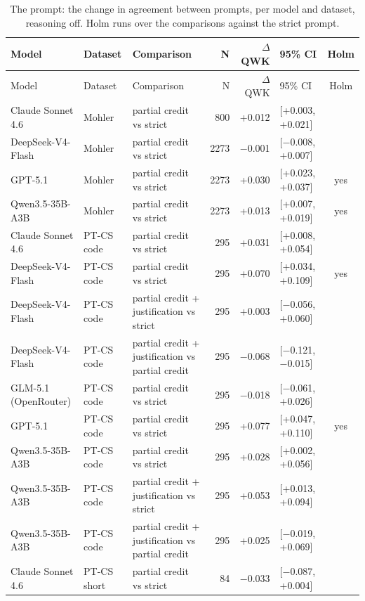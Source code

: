 \documentclass[10pt]{article}
\begin{document}
\begingroup\footnotesize
\begin{longtable}{ll>{\raggedright\arraybackslash}p{4.2cm}rrlc}
\caption{The prompt: the change in agreement between prompts, per model and dataset, reasoning off. Holm runs over the comparisons against the strict prompt.}\\
\hline
Model & Dataset & Comparison & N & $\Delta$QWK & 95\% CI & Holm \\ \hline
\endfirsthead
\hline
Model & Dataset & Comparison & N & $\Delta$QWK & 95\% CI & Holm \\ \hline
\endhead
Claude Sonnet 4.6 & Mohler & partial credit vs strict & 800 & +0.012 & [+0.003, +0.021] &  \\
DeepSeek-V4-Flash & Mohler & partial credit vs strict & 2273 & $-$0.001 & [$-$0.008, +0.007] &  \\
GPT-5.1 & Mohler & partial credit vs strict & 2273 & +0.030 & [+0.023, +0.037] & yes \\
Qwen3.5-35B-A3B & Mohler & partial credit vs strict & 2273 & +0.013 & [+0.007, +0.019] & yes \\
Claude Sonnet 4.6 & PT-CS code & partial credit vs strict & 295 & +0.031 & [+0.008, +0.054] &  \\
DeepSeek-V4-Flash & PT-CS code & partial credit vs strict & 295 & +0.070 & [+0.034, +0.109] & yes \\
DeepSeek-V4-Flash & PT-CS code & partial credit + justification vs strict & 295 & +0.003 & [$-$0.056, +0.060] &  \\
DeepSeek-V4-Flash & PT-CS code & partial credit + justification vs partial credit & 295 & $-$0.068 & [$-$0.121, $-$0.015] &  \\
GLM-5.1 (OpenRouter) & PT-CS code & partial credit vs strict & 295 & $-$0.018 & [$-$0.061, +0.026] &  \\
GPT-5.1 & PT-CS code & partial credit vs strict & 295 & +0.077 & [+0.047, +0.110] & yes \\
Qwen3.5-35B-A3B & PT-CS code & partial credit vs strict & 295 & +0.028 & [+0.002, +0.056] &  \\
Qwen3.5-35B-A3B & PT-CS code & partial credit + justification vs strict & 295 & +0.053 & [+0.013, +0.094] &  \\
Qwen3.5-35B-A3B & PT-CS code & partial credit + justification vs partial credit & 295 & +0.025 & [$-$0.019, +0.069] &  \\
Claude Sonnet 4.6 & PT-CS short & partial credit vs strict & 84 & $-$0.033 & [$-$0.087, +0.004] &  \\

\end{longtable}
\end{document}
